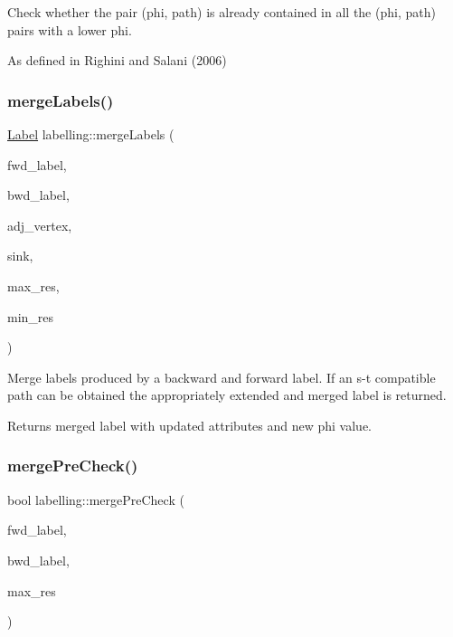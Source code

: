 Check whether the pair (phi, path) is already contained in all the (phi, path) pairs with a lower phi.

As defined in Righini and Salani (2006) \mbox{\label{namespacelabelling_a19937349c6ec5c31d5994aac45c5d2fd}} 
\subsubsection{\texorpdfstring{merge\+Labels()}{mergeLabels()}}
{\footnotesize\ttfamily \hyperlink{classlabelling_1_1Label}{Label} labelling\+::merge\+Labels (\begin{DoxyParamCaption}\item[{const \hyperlink{classlabelling_1_1Label}{labelling\+::\+Label} \&}]{fwd\+\_\+label,  }\item[{const \hyperlink{classlabelling_1_1Label}{labelling\+::\+Label} \&}]{bwd\+\_\+label,  }\item[{const \hyperlink{structbidirectional_1_1AdjVertex}{bidirectional\+::\+Adj\+Vertex} \&}]{adj\+\_\+vertex,  }\item[{const \hyperlink{structbidirectional_1_1Vertex}{bidirectional\+::\+Vertex} \&}]{sink,  }\item[{const std\+::vector$<$ double $>$ \&}]{max\+\_\+res,  }\item[{const std\+::vector$<$ double $>$ \&}]{min\+\_\+res }\end{DoxyParamCaption})}

Merge labels produced by a backward and forward label. If an s-\/t compatible path can be obtained the appropriately extended and merged label is returned.

\begin{DoxyReturn}{Returns}
merged label with updated attributes and new phi value. 
\end{DoxyReturn}
\mbox{\label{namespacelabelling_a9c2e8f16965144d445ba68216dae648f}} 
\subsubsection{\texorpdfstring{merge\+Pre\+Check()}{mergePreCheck()}}
{\footnotesize\ttfamily bool labelling\+::merge\+Pre\+Check (\begin{DoxyParamCaption}\item[{const \hyperlink{classlabelling_1_1Label}{labelling\+::\+Label} \&}]{fwd\+\_\+label,  }\item[{const \hyperlink{classlabelling_1_1Label}{labelling\+::\+Label} \&}]{bwd\+\_\+label,  }\item[{const std\+::vector$<$ double $>$ \&}]{max\+\_\+res }\end{DoxyParamCaption})}

